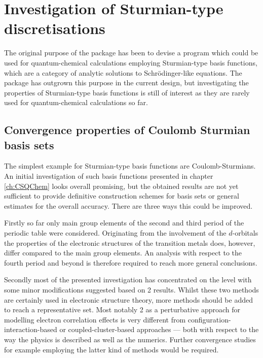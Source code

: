 \section{Investigation of Sturmian-type discretisations}
The original purpose of the \molsturm package has been to devise a program
which could be used for quantum-chemical calculations
employing Sturmian-type basis functions,
which are a category of analytic solutions to Schrödinger-like equations.
The package has outgrown this purpose in the current design,
but investigating the properties of Sturmian-type basis functions is still of interest
as they are rarely used for quantum-chemical calculations so far.

\subsection{Convergence properties of Coulomb Sturmian basis sets}
The simplest example for Sturmian-type basis functions are Coulomb-Sturmians.
An initial investigation of such basis functions presented
in chapter \ref{ch:CSQChem} looks overall promising,
but the obtained results are not yet sufficient to provide definitive
construction schemes for \CS basis sets
or general estimates for the overall accuracy.
There are three ways this could be improved.

Firstly so far only main group elements of the second and third
period of the periodic table were considered.
Originating from the involvement of the $d$-orbitals
the properties of the electronic structures of the transition metals does, however,
differ compared to the main group elements.
An analysis with respect to the fourth period and beyond
is therefore required to reach more general conclusions.

Secondly most of the presented investigation has concentrated on the \HF
level with some minor modifications suggested based on {\MP}2 results.
Whilst these two methods are certainly used in electronic structure theory,
more methods should be added to reach a representative set.
Most notably {\MP}2 as a perturbative approach
for modelling electron correlation effects
is very different from
configuration-interaction-based
or coupled-cluster-based approaches
--- both with respect to the way the physics is described
as well as the numerics.
Further convergence studies for example employing the latter kind of methods
would be required.

